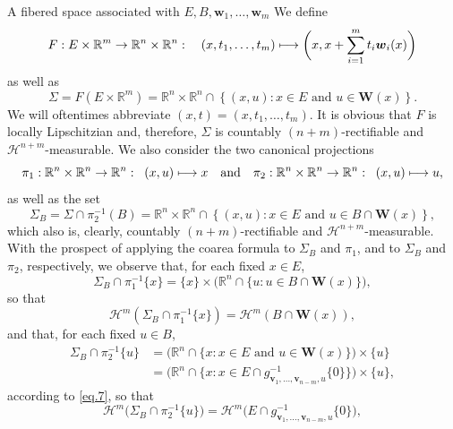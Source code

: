 \documentclass[JEP,XML,SOM,Unicode,ThmDefs,NoEqCountersInSection]{cedram}
\newcommand\mto{\mathchoice{\longmapsto}{\mapsto}{\mapsto}{\mapsto}}
\newcommand{\quand}{\quad\text{and}\quad}
\newenvironment{Empty}[2][\null]{%
\begin{enonce}[remark]{#1}#2}
{\end{enonce}}
\newcommand{\R}{\mathbb{R}}
\newcommand{\Rm}{\R^m}
\newcommand{\Rn}{\R^n}
\newcommand{\calH}{\mathscr{H}}
\newcommand{\bW}{{\boldsymbol{W}}}
\newcommand{\bv}{{\boldsymbol{v}}}
\newcommand{\bw}{{\boldsymbol{w}}}
\begin{document}
\begin{Empty}[A fibered space associated with $E,B,\bw_1,\ldots,\bw_m$]
\label{fibration.1}
We define
\begin{equation*}
F: E \times \Rm \to \Rn \times \Rn:\quad (x,t_1,\ldots,t_m) \mto\biggl(x, x + \sum_{i=1}^m t_i \bw_i(x) \biggr)
\end{equation*}
as well as
\begin{equation*}
\Sigma = F(E \times \Rm) = \Rn \times \Rn \cap \left\{ (x,u): x \in E \text{ and } u \in \bW(x) \right\}.
\end{equation*}
We will oftentimes abbreviate $(x,t)=(x,t_1,\ldots,t_m)$.
It is obvious that $F$ is locally Lipschitzian and, therefore, $\Sigma$ is countably $(n+m)$-rectifiable and $\calH^{n+m}$-measurable.
We also consider the two canonical projections
\begin{equation*}
\pi_1: \Rn \times \Rn \to \Rn:\;\; (x,u) \mto x \quand \pi_2: \Rn \times \Rn \to \Rn:\;\; (x,u) \mto u,
\end{equation*}
as well as the set
\begin{equation*}
\Sigma_B = \Sigma \cap \pi_2^{-1}(B) = \Rn \times \Rn \cap \left\{ (x,u): x \in E \text{ and } u \in B \cap \bW(x) \right\},
\end{equation*}
which also is, clearly, countably $(n+m)$-rectifiable and $\calH^{n+m}$-measurable.
With the prospect of applying the coarea formula to $\Sigma_B$ and $\pi_1$, and to $\Sigma_B$ and $\pi_2$, respectively, we observe that, for each fixed $x \in E$,
\begin{equation*}
\Sigma_B \cap \pi_1^{-1}\{x\} = \{x\} \times \big(\Rn \cap \{ u: u \in B \cap \bW(x) \}\big),
\end{equation*}
so that
\begin{equation}
\label{eq.6}
\calH^m \left(\Sigma_B \cap \pi_1^{-1}\{x\} \right) = \calH^m(B \cap \bW(x)),
\end{equation}
and that, for each fixed $u \in B$,
\begin{equation*}
\begin{split}
\Sigma_B \cap \pi_2^{-1}\{u\} & = \big(\Rn \cap \{ x: x \in E \text{ and } u \in \bW(x) \} \big)\times \{u\}\\
& = \bigl(\Rn\cap\{ x: x \in E \cap g_{\bv_1,\ldots,\bv_{n-m},u}^{-1}\{0\}\} \bigr) \times \{u\},
\end{split}
\end{equation*}
according to \eqref{eq.7}, so that
\begin{equation}
\label{eq.8}
\calH^m \bigl(\Sigma_B \cap \pi_2^{-1}\{u\}\bigr) = \calH^m \bigl(E \cap g_{\bv_1,\ldots,\bv_{n-m},u}^{-1}\{0\}\bigr),

\end{equation}
\end{Empty}
\end{document}
